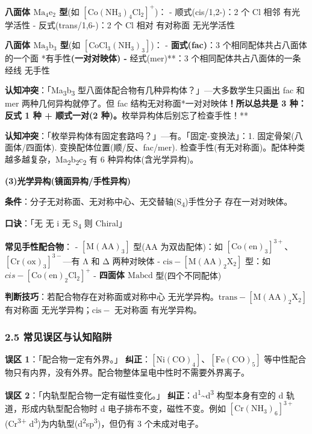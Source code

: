 \textbf{八面体 \(\mathrm{Ma_4e_2}\) 型}(如 \([\mathrm{Co(NH_3)_4Cl_2}]^+\))：
- 顺式(cis/1,2-)：2 个 Cl 相邻 \箭 有光学活性
- 反式(trans/1,6-)：2 个 Cl 相对 \箭 有对称面 \箭 无光学活性

\textbf{八面体 \(\mathrm{Ma_3b_3}\) 型}(如 \([\mathrm{CoCl_3(NH_3)_3}]\))：
- \textbf{面式(fac)}：3 个相同配体共占八面体的一个面 \箭 **有手性\textbf{(一对对映体)
- }经式(mer)**：3 个相同配体共占八面体的一条经线 \箭 无手性

\textbf{认知冲突}：「Ma\textsubscript{3}b\textsubscript{3} 型八面体配合物有几种异构体？」---大多数学生只画出 fac 和 mer 两种几何异构就停了。但 fac 结构无对称面*一对对映体\textbf{！所以总共是 3 种：反式 1 种 + 顺式一对(2 种)。}枚举异构体后别忘了检查手性！**

\textbf{认知冲突}：「枚举异构体有固定套路吗？」---有。「固定-变换法」：1. 固定骨架(八面体/四面体). 变换配体位置(顺/反、fac/mer). 检查手性(有无对称面)。配体种类越多越复杂，Ma\textsubscript{2}b\textsubscript{2}c\textsubscript{2} 有 6 种异构体(含光学异构)。

\textbf{(3)光学异构(镜面异构/手性异构)}

\textbf{条件}：分子无对称面、无对称中心、无交替轴(S\textsubscript{4})\箭 手性分子 \箭 存在一对对映体。

\textbf{口诀}：「无  无 i 无 S\textsubscript{4} 则 Chiral」

\textbf{常见手性配合物}：
- \(\mathrm{[M(AA)_3]}\) 型(AA 为双齿配体)：如 \([\mathrm{Co(en)_3}]^{3+}\)、\([\mathrm{Cr(ox)_3}]^{3-}\)---有 Λ 和 Δ 两种对映体
- \(\mathrm{cis-[M(AA)_2X_2]}\) 型：如 \(cis-[\mathrm{Co(en)_2Cl_2}]^+\)
- \textbf{四面体 \(\mathrm{Mabcd}\)} 型(四个不同配体)

\textbf{判断技巧}：若配合物存在对称面或对称中心 \箭 无光学异构。\(\mathrm{trans-[M(AA)_2X_2]}\) 有对称面 \箭 无光学异构；\(\mathrm{cis-}\) 无对称面 \箭 有光学异构。

\subsubsection{2.5 常见误区与认知陷阱}\label{ux5e38ux89c1ux8befux533aux4e0eux8ba4ux77e5ux9677ux9631}

\textbf{误区 1}：「配合物一定有外界。」
\textbf{纠正}：\(\mathrm{[Ni(CO)_4]}\)、\(\mathrm{[Fe(CO)_5]}\) 等中性配合物只有内界，没有外界。配合物整体呈电中性时不需要外界离子。

\textbf{误区 2}：「内轨型配合物一定有磁性变化。」
\textbf{纠正}：d\textsuperscript{1}\textasciitilde d\textsuperscript{3} 构型本身有空的 d 轨道，形成内轨型配合物时 d 电子排布不变，磁性不变。例如 \([\mathrm{Cr(NH_3)_6}]^{3+}\)(Cr\textsuperscript{3+} d\textsuperscript{3})为内轨型(d\textsuperscript{2}sp\textsuperscript{3})，但仍有 3 个未成对电子。

